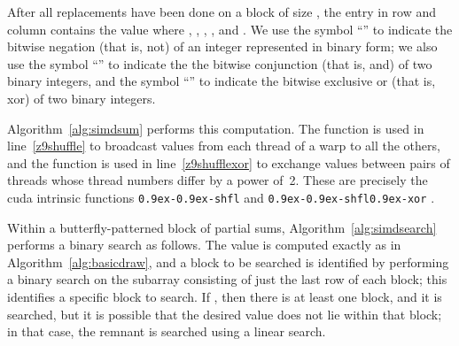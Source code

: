\documentclass[10pt,nohyperref]{sigplanconf}
\begin{document}
After all replacements have been done on a block of size ,
the entry in row  and column  contains the value  where
,
,
,
, and .
We use the symbol ``'' to indicate the bitwise negation (that is, {\sc not}) of an integer
represented in binary form; we also use the symbol ``'' to indicate the
the bitwise conjunction (that is, {\sc and}) of two binary integers, and
the symbol ``'' to indicate
the bitwise exclusive {\sc or} (that is, {\sc xor}) of two binary integers.

Algorithm~\ref{alg:simdsum} performs this computation.  The function  is used
in line~\ref{z9shuffle} to broadcast values from each thread of a warp to all the others,
and the function  is used
in line~\ref{z9shufflexor} to exchange values between pairs of threads whose thread numbers
differ by a power of~2.  These are precisely the {\sc cuda} intrinsic functions
{\tt \lower0.9ex\hbox{-}\lower0.9ex\hbox{-}shfl} and {\tt \lower0.9ex\hbox{-}\lower0.9ex\hbox{-}shfl\lower0.9ex\hbox{-}xor}
\cite{CUDA-handbook,CUDA-website-shuffle-functions}.








Within a butterfly-patterned block of partial sums,
Algorithm~\ref{alg:simdsearch} performs a binary search as follows.
The  value is computed exactly as in Algorithm~\ref{alg:basicdraw}, and a block to be searched is identified
by performing a binary search on the subarray consisting of just the last row of each block;
this identifies a specific block to search.  If , then there is at least one block,
and it is searched, but it is possible that the desired  value does not lie within that
block; in that case, the remnant is searched using a linear search.
\end{document}
